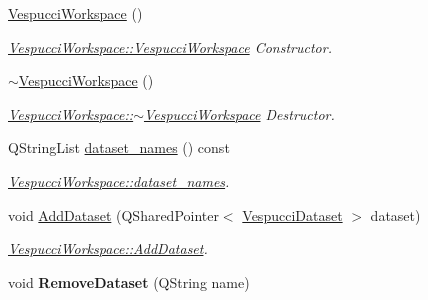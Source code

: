 \begin{DoxyCompactItemize}
\item 
\hypertarget{class_vespucci_workspace_a123db1f916347e1aea7cdb175b5364c0}{\hyperlink{class_vespucci_workspace_a123db1f916347e1aea7cdb175b5364c0}{Vespucci\+Workspace} ()}\label{class_vespucci_workspace_a123db1f916347e1aea7cdb175b5364c0}

\begin{DoxyCompactList}\small\item\em \hyperlink{class_vespucci_workspace_a123db1f916347e1aea7cdb175b5364c0}{Vespucci\+Workspace\+::\+Vespucci\+Workspace} Constructor. \end{DoxyCompactList}\item 
\hypertarget{class_vespucci_workspace_a33a6d0777091160a88bc78b7d5ce6617}{\hyperlink{class_vespucci_workspace_a33a6d0777091160a88bc78b7d5ce6617}{$\sim$\+Vespucci\+Workspace} ()}\label{class_vespucci_workspace_a33a6d0777091160a88bc78b7d5ce6617}

\begin{DoxyCompactList}\small\item\em \hyperlink{class_vespucci_workspace_a33a6d0777091160a88bc78b7d5ce6617}{Vespucci\+Workspace\+::$\sim$\+Vespucci\+Workspace} Destructor. \end{DoxyCompactList}\item 
Q\+String\+List \hyperlink{class_vespucci_workspace_a31c9d7cd424905860313769a75d1f8d0}{dataset\+\_\+names} () const 
\begin{DoxyCompactList}\small\item\em \hyperlink{class_vespucci_workspace_a31c9d7cd424905860313769a75d1f8d0}{Vespucci\+Workspace\+::dataset\+\_\+names}. \end{DoxyCompactList}\item 
void \hyperlink{class_vespucci_workspace_a9dac697d9be0cd6549fd849136ec9f73}{Add\+Dataset} (Q\+Shared\+Pointer$<$ \hyperlink{class_vespucci_dataset}{Vespucci\+Dataset} $>$ dataset)
\begin{DoxyCompactList}\small\item\em \hyperlink{class_vespucci_workspace_a9dac697d9be0cd6549fd849136ec9f73}{Vespucci\+Workspace\+::\+Add\+Dataset}. \end{DoxyCompactList}\item 
\hypertarget{class_vespucci_workspace_a46e8312e66cac4cf8c1d975dd8b24725}{void {\bfseries Remove\+Dataset} (Q\+String name)}\label{class_vespucci_workspace_a46e8312e66cac4cf8c1d975dd8b24725}


\end{DoxyCompactItemize}
